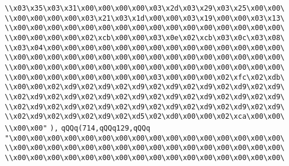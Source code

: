 \verb|\\x03\x35\x03\x31\x00\x00\x00\x00\x03\x2d\x03\x29\x03\x25\x00\x00\|\newline
\verb|\\x00\x00\x00\x00\x03\x21\x03\x1d\x00\x00\x03\x19\x00\x00\x03\x13\|\newline
\verb|\\x00\x00\x00\x00\x00\x00\x00\x00\x00\x00\x00\x00\x00\x00\x00\x00\|\newline
\verb|\\x00\x00\x00\x00\x02\xcb\x00\x00\x03\x0e\x02\xcb\x03\x0c\x03\x08\|\newline
\verb|\\x03\x04\x00\x00\x00\x00\x00\x00\x00\x00\x00\x00\x00\x00\x00\x00\|\newline
\verb|\\x00\x00\x00\x00\x00\x00\x00\x00\x00\x00\x00\x00\x00\x00\x00\x00\|\newline
\verb|\\x00\x00\x00\x00\x00\x00\x00\x00\x00\x00\x00\x00\x00\x00\x00\x00\|\newline
\verb|\\x00\x00\x00\x00\x00\x00\x00\x00\x03\x00\x00\x00\x02\xfc\x02\xdb\|\newline
\verb|\\x00\x00\x02\xd9\x02\xd9\x02\xd9\x02\xd9\x02\xd9\x02\xd9\x02\xd9\|\newline
\verb|\\x02\xd9\x02\xd9\x02\xd9\x02\xd9\x02\xd9\x02\xd9\x02\xd9\x02\xd9\|\newline
\verb|\\x02\xd9\x02\xd9\x02\xd9\x02\xd9\x02\xd9\x02\xd9\x02\xd9\x02\xd9\|\newline
\verb|\\x02\xd9\x02\xd9\x02\xd9\x02\xd5\x02\xd0\x00\x00\x02\xca\x00\x00\|\newline
\verb|\\x00\x00"|\newline
\verb|),|\newline
\verb|qQQq(714,qQQq129,qQQq|\newline
\verb|"\x00\x00\x00\x00\x00\x00\x00\x00\x00\x00\x00\x00\x00\x00\x00\x00\|\newline
\verb|\\x00\x00\x00\x00\x00\x00\x00\x00\x00\x00\x00\x00\x00\x00\x00\x00\|\newline
\verb|\\x00\x00\x00\x00\x00\x00\x00\x00\x00\x00\x00\x00\x00\x00\x00\x00\|\newline

